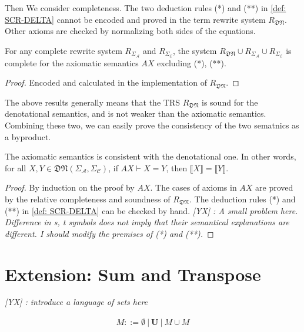 \documentclass[manuscript, review, timestamp]{acmart}
\newcommand{\yx}[1]{\textit{\color{blue}[YX] : #1}}
\newcommand*{\sem}[1]{\llbracket #1 \rrbracket}
\begin{document}
Then We consider completeness. The two deduction rules (*) and (**) in \ref{def: SCR-DELTA} cannot be encoded and proved in the term rewrite system $R_\mathfrak{DN}$. Other axioms are checked by normalizing both sides of the equations.

\begin{lemma}
  For any complete rewrite system $R_{\Sigma_\mathcal{A}}$ and $R_{\Sigma_\mathcal{E}}$, the system $R_\mathfrak{DN}\cup R_{\Sigma_\mathcal{A}} \cup R_{\Sigma_\mathcal{E}}$ is complete for the axiomatic semantics $AX$ excluding (*), (**).
\end{lemma}
\begin{proof}
  Encoded and calculated in the implementation of $R_\mathfrak{DN}$.
\end{proof}

The above results generally means that the TRS $R_\mathfrak{DN}$ is sound for the denotational semantics, and is not weaker than the axiomatic semantics. Combining these two, we can easily prove the consistency of the two sematnics as a byproduct.

\begin{corollary}
  The axiomatic semantics is consistent with the denotational one. In other words, for all $X, Y \in \mathfrak{DN}(\Sigma_\mathcal{A}, \Sigma_\mathcal{C})$, if $AX \vdash X = Y$, then $\sem{X} = \sem{Y}$.
\end{corollary}
\begin{proof}
  By induction on the proof by $AX$. The cases of axioms in $AX$ are proved by the relative completeness and soundness of $R_\mathfrak{DN}$. The deduction rules (*) and (**) in \ref{def: SCR-DELTA} can be checked by hand.
  \yx{A small problem here. Difference in s, t symbols does not imply that their semantical explanations are different. I should modify the premises of (*) and (**).}
\end{proof}



\section{Extension: Sum and Transpose}

\yx{introduce a language of sets here}

\begin{definition}[set]
  \begin{align*}
    M ::= \emptyset\ |\ \mathbf{U}\ |\ M \cup M
  \end{align*}
\end{definition}
\end{document}
